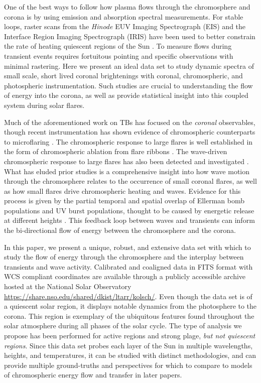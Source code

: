 \documentclass[twocolumn]{aastex62}
\begin{document}
One of the best ways to follow how plasma flows through the chromosphere and corona is by using emission and absorption spectral measurements. 
For stable loops, raster scans from the \textit{Hinode} EUV Imaging Spectrograph (EIS) and the Interface Region Imaging Spectrograph (IRIS) have been used to better constrain the rate of heating quiescent regions of the Sun \citep[e.g.][]{2016BrooksWarren_NTWidths,2016TestaEA_ARLoopsIRISEIS, 2017GhoshEA_LoopsIRISEIS}. 
To measure flows during transient events requires fortuitous pointing and specific observations with minimal rastering. 
Here we present an ideal data set to study dynamic spectra of small scale, short lived coronal brightenings with coronal, chromospheric, and photospheric instrumentation. 
Such studies are crucial to understanding the flow of energy into the corona, as well as provide statistical insight into this coupled system during solar flares.

Much of the aforementioned work on TBs has focused on the \emph{coronal} observables, though recent instrumentation has shown evidence of chromospheric counterparts to microflaring \citep[][]{2016TestaEA_ARLoopsIRISEIS, 2017GhoshEA_LoopsIRISEIS}. 
The chromospheric response to large flares is well established in the form of chromospheric ablation from flare ribbons \citep[][]{2017Benz_LRSP}. 
The wave-driven chromospheric response to large flares has also been detected and investigated \citep[][and references within]{2014LiuOfman_EUVwaves, 2016RussellEA_Sunquakes}. 
What has eluded prior studies is a comprehensive insight into how wave motion through the chromosphere relates to the occurrence of small coronal flares, as well as how small flares drive chromospheric heating and waves. 
Evidence for this process is given by the partial temporal and spatial overlap of Ellerman bomb populations and UV burst populations, thought to be caused by energetic release at different heights \citep{2019Vissers, 2018Young}.
This feedback loop between waves and transients can inform the bi-directional flow of energy between the chromosphere and the corona.

In this paper, we present a unique, robust, and extensive data set with which to study the flow of energy through the chromosphere and the interplay between transients and wave activity.
Calibrated and coaligned data in FITS format with WCS compliant coordinates are available through a publicly accessible archive hosted at the National Solar Observatory \url{https://share.nso.edu/shared/dkist/ltarr/kolsch/}.
Even though the data set is of a quiescent solar region, it displays notable dynamics from the photosphere to the corona. 
This region is exemplary of the ubiquitous features found throughout the solar atmosphere during all phases of the solar cycle. 
The type of analysis we propose has been performed for active regions and strong plage, \emph{but not quiescent regions}. 
Since this data set probes each layer of the Sun in multiple wavelengths, heights, and temperatures, it can be studied with distinct methodologies, and can provide multiple ground-truths and perspectives for which to compare to models of chromospheric energy flow and transfer in later papers.
\end{document}
